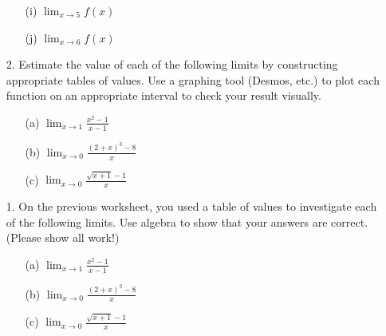 \documentclass[10pt, oneside]{amsart}
\begin{document}
\begin{enumerate}[leftmargin=0pt]
\begin{multicols}{2}
\begin{enumerate}
\vspace{0.75in}

\item[(i)] $\displaystyle\lim_{x\to 5} f(x)$

\vspace{0.75in}

\item[(j)] $\displaystyle\lim_{x\to 6} f(x)$

\vfill

\end{enumerate}
\end{multicols}

\newpage


\item[2.] Estimate the value of each of the following limits by constructing appropriate tables of values. Use a graphing tool (Desmos, etc.) to plot each function on an appropriate interval to check your result visually. 

\medskip

\begin{enumerate}

\item[(a)] $\displaystyle\lim_{x\to 1}\frac{x^2-1}{x-1}$

\vfill

\item[(b)] $\displaystyle\lim_{x\to 0}\frac{(2+x)^3-8}{x}$

\vfill

\item[(c)] $\displaystyle\lim_{x\to0}\frac{\sqrt{x+1}-1}{x}$

\vfill

\end{enumerate}
\item[1.] On the previous worksheet, you used a table of values to investigate each of the following limits. Use algebra to show that your answers are correct. (Please show all work!)

\medskip

\begin{enumerate}

\item[(a)] $\displaystyle\lim_{x\to 1}\frac{x^2-1}{x-1}$

\vfill

\item[(b)] $\displaystyle\lim_{x\to 0}\frac{(2+x)^3-8}{x}$

\vfill

\item[(c)] $\displaystyle\lim_{x\to0}\frac{\sqrt{x+1}-1}{x}$


\end{enumerate}
\end{enumerate}
\end{document}
